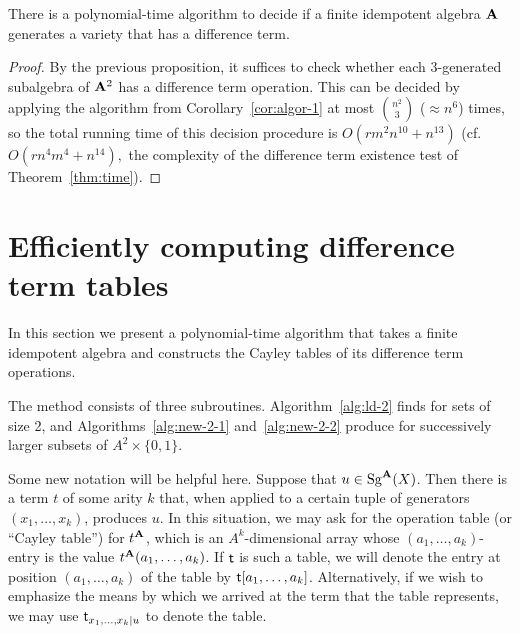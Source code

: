 \begin{corollary}
  There is a polynomial-time algorithm to decide if a finite idempotent algebra $\mathbf{A}$ generates a variety that has a difference term.
\end{corollary}

\begin{proof}
  By the previous proposition, it suffices to check whether each 3-generated subalgebra of 
  $\mathbf{A}^2$ has a difference term operation. This can be decided by applying the 
  algorithm from Corollary~\ref{cor:algor-1} at most $\binom{n^2}{3}$ ($\approx n^6$) times, 
  so the total running time of this decision procedure is $O(rm^2n^{10} + n^{13})$ (cf.~$O(rn^4m^4 + n^{14}),$ 
  the complexity of the difference term existence test of Theorem~\ref{thm:time}).
\end{proof}

\section{Efficiently computing difference term tables}
\label{sec:comp-diff-term}
In this section we present a polynomial-time algorithm that takes 
a finite idempotent algebra and constructs the Cayley tables of 
its difference term operations.

The method consists of three subroutines.
Algorithm~\ref{alg:ld-2} finds \ldtos for sets
of size 2, and Algorithms~\ref{alg:new-2-1} and~\ref{alg:new-2-2}
produce \ldtos for successively larger subsets of $A^2 \times \{0,1\}$.

Some new notation will be helpful here.  Suppose that $ u \in \operatorname{Sg}^{\mathbf{A}}(X)$.
Then there is a term $t$ of some arity $k$ that, when applied to a certain tuple of 
generators $(x_1, \dots, x_k)$, produces $u$.  
In this situation, we may ask for the operation table (or ``Cayley table'') 
for $t^{\mathbf{A}}$, which is an $A^k$-dimensional array whose $(a_1, \dots, a_k)$-entry
is the value $t^{\mathbf{A}}(a_1, \dots, a_k)$. 
If $\mathsf{t}$ is such a table, we will denote the 
entry at position $(a_1, \dots, a_k)$ of the table by $\mathsf{t}[a_1, \dots, a_k]$.
Alternatively, if we wish to emphasize the means by which 
we arrived at the term that the table represents, we may use
$\mathsf{t}_{x_1,\dots, x_k \mid u}$ to denote the table.

\newcommand{\triple}{\ensuremath{(a_0,a_1),(b_0,a_1),(b_0,b_1)}}

